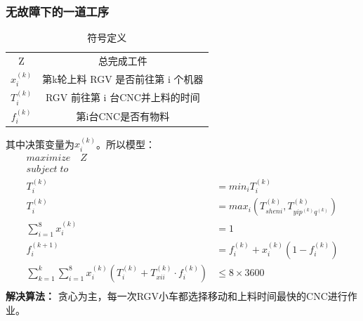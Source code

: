 \documentclass[12pt,a4paper]{article}
\begin{document}
\subsubsection{无故障下的一道工序}
\begin{table}[!htbp]
  \caption{符号定义}
  \centering
  \begin{tabular}{c|c}
    \hline
    Z& 总完成工件\\
    $x_i^{(k)}$& 第k轮上料 RGV 是否前往第 i 个机器\\
    $T_i^{(k)}$& RGV 前往第 i 台CNC并上料的时间\\
    $f_i^{(k)}$& 第i台CNC是否有物料\\
    \hline
  \end{tabular}
\end{table}
其中决策变量为$x_i^{(k)}$。所以模型：
\begin{equation*}
  \begin{split}
    maximize\quad Z&\\
    subject\; to&\\
    T_i^{(k)} & = min_iT_i^{(k)}\\
    T_i^{(k)} & = max_i(T_{sheni}^{(k)}, T_{yip^{(k)}q^{(k)}}^{(k)})\\
    \sum_{i = 1}^8x_i^{(k)} & = 1\\
    f_i^{(k+1)} & = f_i^{(k)} + x_i^{(k)}(1-f_i^{(k)})\\
    \sum_{k = 1}^k\sum_{i = 1}^8x_i^{(k)}(T_i^{(k)} + T_{xii}^{(k)}\cdot f_i^{(k)})& \le 8\times 3600\\
  \end{split}
\end{equation*}
\textbf{解决算法：}
贪心为主，每一次RGV小车都选择移动和上料时间最快的CNC进行作业。
\end{document}
